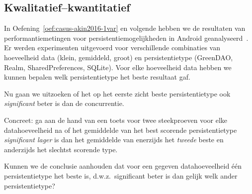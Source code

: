 \subsection{Kwalitatief--kwantitatief}
\label{ssec:oef-kwal-kwant}

\begin{exercise}
  \label{oef:casus-akin2016-toets}
  
  In Oefening~\ref{oef:casus-akin2016-1var} en volgende hebben we de resultaten van performantiemetingen voor persistentiemogelijkheden in Android geanalyseerd~\autocite{Akin2016}. Er werden experimenten uitgevoerd voor verschillende combinaties van hoeveelheid data (klein, gemiddeld, groot) en persistentietype (GreenDAO, Realm, SharedPreferences, SQLite). Voor elke hoeveelheid data hebben we kunnen bepalen welk persistentietype het beste resultaat gaf.
  
  Nu gaan we uitzoeken of het op het eerste zicht beste persistentietype ook \emph{significant} beter is dan de concurrentie.
  
  Concreet: ga aan de hand van een toets voor twee steekproeven voor elke datahoeveelheid na of het gemiddelde van het best scorende persistentietype \emph{significant lager} is dan het gemiddelde van enerzijds het \emph{tweede} beste en anderzijds het slechtst scorende type.
  
  Kunnen we de conclusie aanhouden dat voor een gegeven datahoeveelheid één persistentietype het beste is, d.w.z.~significant beter is dan gelijk welk ander persistentietype?
\end{exercise}

